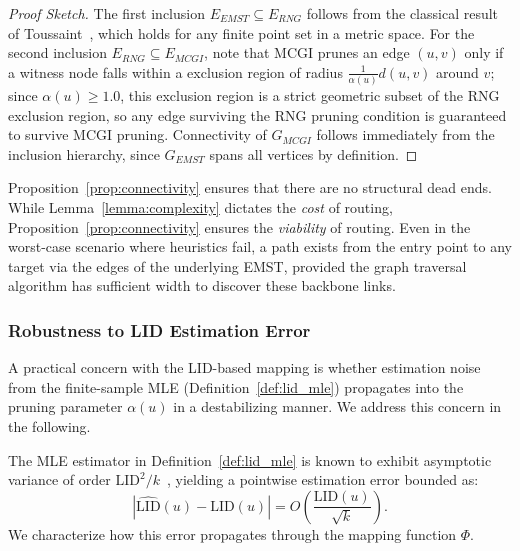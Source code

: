 \documentclass{article}
\theoremstyle{plain}
\theoremstyle{definition}
\theoremstyle{remark}
\begin{document}
\begin{proof}[Proof Sketch]
The first inclusion $E_{EMST} \subseteq E_{RNG}$ follows from the classical result of Toussaint~\cite{TOUSSAINT1980261}, which holds for any finite point set in a metric space.
For the second inclusion $E_{RNG} \subseteq E_{MCGI}$, note that MCGI prunes an edge $(u,v)$ only if a witness node falls within a exclusion region of radius $\frac{1}{\alpha(u)}d(u,v)$ around $v$; since $\alpha(u) \geq 1.0$, this exclusion region is a strict geometric subset of the RNG exclusion region, so any edge surviving the RNG pruning condition is guaranteed to survive MCGI pruning.
Connectivity of $G_{MCGI}$ follows immediately from the inclusion hierarchy, since $G_{EMST}$ spans all vertices by definition.
\end{proof}

Proposition~\ref{prop:connectivity} ensures that there are no structural dead ends. While Lemma~\ref{lemma:complexity} dictates the \textit{cost} of routing, Proposition~\ref{prop:connectivity} ensures the \textit{viability} of routing. Even in the worst-case scenario where heuristics fail, a path exists from the entry point to any target via the edges of the underlying EMST, provided the graph traversal algorithm has sufficient width to discover these backbone links.

\subsubsection{Robustness to LID Estimation Error}
\label{subsec:robustness}

A practical concern with the LID-based mapping is whether estimation
noise from the finite-sample MLE (Definition~\ref{def:lid_mle})
propagates into the pruning parameter $\alpha(u)$ in a destabilizing
manner. We address this concern in the following.

The MLE estimator in Definition~\ref{def:lid_mle} is known to exhibit
asymptotic variance of order $\mathrm{LID}^2/k$~\cite{NIPS2004_74934548},
yielding a pointwise estimation error bounded as:
\begin{equation}
    \left|\widehat{\mathrm{LID}}(u) - \mathrm{LID}(u)\right|
    = O\!\left(\frac{\mathrm{LID}(u)}{\sqrt{k}}\right).
    \label{eq:lid_error}
\end{equation}
We characterize how this error propagates through the mapping
function $\Phi$.
\end{document}
